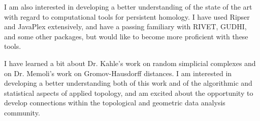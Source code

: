 \documentclass[11pt,letterpaper,sans]{moderncv}        %
\begin{document}
I am also interested in developing a better understanding of the state of the art with regard to computational tools for persistent homology. 
I have used Ripser and JavaPlex extensively, and have a passing familiary with RIVET, GUDHI, and some other packages, but would like to become more proficient with these tools.

I have learned a bit about Dr. Kahle's work on random simplicial complexes and on Dr. Memoli's work on Gromov-Hausdorff distances.
I am interested in developing a better understanding both of this work and of the algorithmic and statistical aspects of applied topology, and am excited about the opportunity to develop connections within the topological and geometric data analysis community.
%
\end{document}
